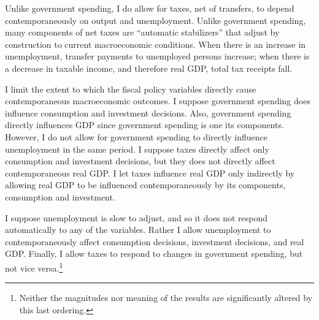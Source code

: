 \documentclass[12pt]{article}
\begin{document}
Unlike government spending, I do allow for taxes, net of transfers, to depend contemporaneously on output and unemployment.  Unlike government spending, many components of net taxes are ``automatic stabilizers'' that adjust by construction to current macroeconomic conditions.  When there is an increase in unemployment, transfer payments to unemployed persons increase; when there is a decrease in taxable income, and therefore real GDP, total tax receipts fall.

I limit the extent to which the fiscal policy variables directly cause contemporaneous macroeconomic outcomes.  I suppose government spending does influence consumption and investment decisions.  Also, government spending directly influences GDP since government spending is one its components.  However, I do not allow for government spending to directly influence unemployment in the same period.  I suppose taxes directly affect only consumption and investment decisions, but they does not directly affect contemporaneous real GDP.  I let taxes influence real GDP only indirectly by allowing real GDP to be influenced contemporaneously by its components, consumption and investment.  

I suppose unemployment is slow to adjust, and so it does not respond automatically to any of the variables.  Rather I allow unemployment to contemporaneously affect consumption decisions, investment decisions, and real GDP.  Finally, I allow taxes to respond to changes in government spending, but not vice versa.\footnote{Neither the magnitudes nor meaning of the results are significantly altered by this last ordering.}
\end{document}
